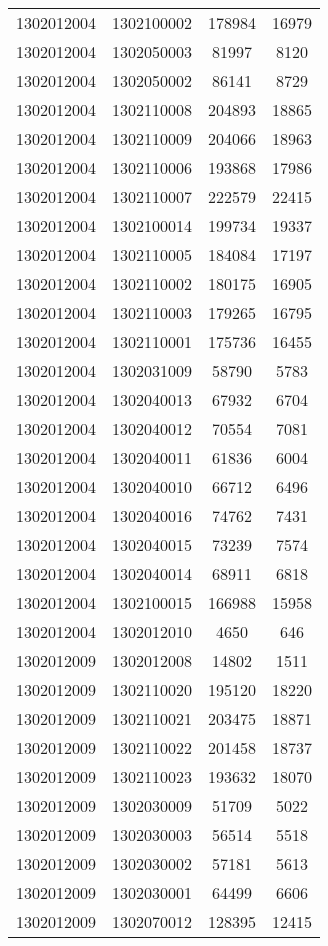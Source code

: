 \begin{longtable}{llcc}
1302012004 & 1302100002 & 178984 & 16979\\
1302012004 & 1302050003 & 81997 & 8120\\
1302012004 & 1302050002 & 86141 & 8729\\
1302012004 & 1302110008 & 204893 & 18865\\
1302012004 & 1302110009 & 204066 & 18963\\
1302012004 & 1302110006 & 193868 & 17986\\
1302012004 & 1302110007 & 222579 & 22415\\
1302012004 & 1302100014 & 199734 & 19337\\
1302012004 & 1302110005 & 184084 & 17197\\
1302012004 & 1302110002 & 180175 & 16905\\
1302012004 & 1302110003 & 179265 & 16795\\
1302012004 & 1302110001 & 175736 & 16455\\
1302012004 & 1302031009 & 58790 & 5783\\
1302012004 & 1302040013 & 67932 & 6704\\
1302012004 & 1302040012 & 70554 & 7081\\
1302012004 & 1302040011 & 61836 & 6004\\
1302012004 & 1302040010 & 66712 & 6496\\
1302012004 & 1302040016 & 74762 & 7431\\
1302012004 & 1302040015 & 73239 & 7574\\
1302012004 & 1302040014 & 68911 & 6818\\
1302012004 & 1302100015 & 166988 & 15958\\
1302012004 & 1302012010 & 4650 & 646\\
1302012009 & 1302012008 & 14802 & 1511\\
1302012009 & 1302110020 & 195120 & 18220\\
1302012009 & 1302110021 & 203475 & 18871\\
1302012009 & 1302110022 & 201458 & 18737\\
1302012009 & 1302110023 & 193632 & 18070\\
1302012009 & 1302030009 & 51709 & 5022\\
1302012009 & 1302030003 & 56514 & 5518\\
1302012009 & 1302030002 & 57181 & 5613\\
1302012009 & 1302030001 & 64499 & 6606\\
1302012009 & 1302070012 & 128395 & 12415\\

\end{longtable}
